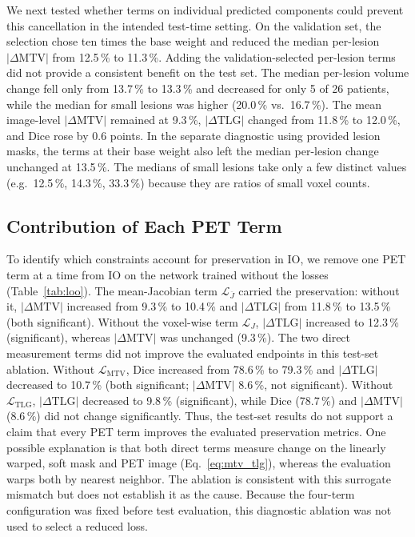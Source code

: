 We next tested whether terms on individual predicted components could prevent this cancellation in the intended test-time setting.
On the validation set, the selection chose ten times the base weight and reduced the median per-lesion $|\Delta\mathrm{MTV}|$ from 12.5\,\% to 11.3\,\%.
Adding the validation-selected per-lesion terms did not provide a consistent benefit on the test set.
The median per-lesion volume change fell only from 13.7\,\% to 13.3\,\% and decreased for only 5 of 26 patients, while the median for small lesions was higher (20.0\,\% vs.\ 16.7\,\%).
The mean image-level $|\Delta\mathrm{MTV}|$ remained at 9.3\,\%, $|\Delta\mathrm{TLG}|$ changed from 11.8\,\% to 12.0\,\%, and Dice rose by 0.6 points.
In the separate diagnostic using provided lesion masks, the terms at their base weight also left the median per-lesion change unchanged at 13.5\,\%.
The medians of small lesions take only a few distinct values (e.g.\ 12.5\,\%, 14.3\,\%, 33.3\,\%) because they are ratios of small voxel counts.



\subsection{Contribution of Each PET Term}
\label{sect:res_loo}
To identify which constraints account for preservation in IO, we remove one PET term at a time from IO on the network trained without the losses (Table~\ref{tab:loo}).
The mean-Jacobian term $\mathcal{L}_{\overline{J}}$ carried the preservation: without it, $|\Delta\mathrm{MTV}|$ increased from 9.3\,\% to 10.4\,\% and $|\Delta\mathrm{TLG}|$ from 11.8\,\% to 13.5\,\% (both significant).
Without the voxel-wise term $\mathcal{L}_{J}$, $|\Delta\mathrm{TLG}|$ increased to 12.3\,\% (significant), whereas $|\Delta\mathrm{MTV}|$ was unchanged (9.3\,\%).
The two direct measurement terms did not improve the evaluated endpoints in this test-set ablation.
Without $\mathcal{L}_{\mathrm{MTV}}$, Dice increased from 78.6\,\% to 79.3\,\% and $|\Delta\mathrm{TLG}|$ decreased to 10.7\,\% (both significant; $|\Delta\mathrm{MTV}|$ 8.6\,\%, not significant).
Without $\mathcal{L}_{\mathrm{TLG}}$, $|\Delta\mathrm{TLG}|$ decreased to 9.8\,\% (significant), while Dice (78.7\,\%) and $|\Delta\mathrm{MTV}|$ (8.6\,\%) did not change significantly.
Thus, the test-set results do not support a claim that every PET term improves the evaluated preservation metrics.
One possible explanation is that both direct terms measure change on the linearly warped, soft mask and PET image (Eq.~\ref{eq:mtv_tlg}), whereas the evaluation warps both by nearest neighbor.
The ablation is consistent with this surrogate mismatch but does not establish it as the cause.
Because the four-term configuration was fixed before test evaluation, this diagnostic ablation was not used to select a reduced loss.

